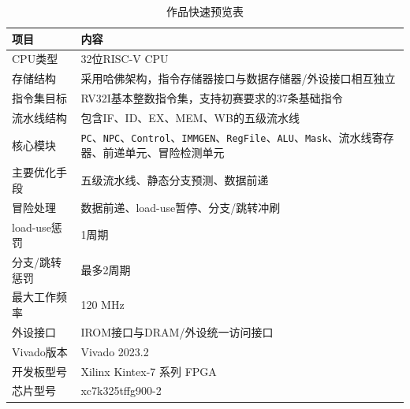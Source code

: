 \documentclass[12pt,a4paper]{ctexart}
\newcommand{\code}[1]{\texttt{#1}}
\begin{document}
\begin{table}[H]
	\centering
	\caption{作品快速预览表}
	\begin{tabularx}{\textwidth}{p{4cm}X}
		\toprule
		项目         & 内容                                                                                                         \\
		\midrule
		CPU类型      & 32位RISC-V CPU                                                                                              \\
		存储结构       & 采用哈佛架构，指令存储器接口与数据存储器/外设接口相互独立                                                                              \\
		指令集目标      & RV32I基本整数指令集，支持初赛要求的37条基础指令                                                                                \\
		流水线结构      & 包含IF、ID、EX、MEM、WB的五级流水线                                                                                    \\
		核心模块       & \code{PC}、\code{NPC}、\code{Control}、\code{IMMGEN}、\code{RegFile}、\code{ALU}、\code{Mask}、流水线寄存器、前递单元、冒险检测单元 \\
		主要优化手段     & 五级流水线、静态分支预测、数据前递                                                                                          \\
		冒险处理       & 数据前递、load-use暂停、分支/跳转冲刷                                                                                    \\
		load-use惩罚 & 1周期                                                                                                        \\
		分支/跳转惩罚    & 最多2周期                                                                                                      \\
		最大工作频率     & 120 MHz                                                                                                    \\
		外设接口       & IROM接口与DRAM/外设统一访问接口                                                                                       \\
		Vivado版本   & Vivado 2023.2                                                                                              \\
		开发板型号      & Xilinx Kintex-7 系列 FPGA                                                                                    \\
		芯片型号       & xc7k325tffg900-2                                                                                           \\
		\bottomrule
	\end{tabularx}
\end{table}
\end{document}
